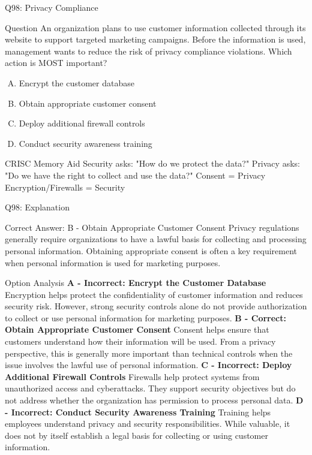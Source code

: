 \documentclass{beamer}
\begin{document}
	
	\begin{frame}{Q98: Privacy Compliance} \begin{block}{Question} An organization plans to use customer information collected through its website to support targeted marketing campaigns. Before the information is used, management wants to reduce the risk of privacy compliance violations. Which action is MOST important? \end{block} \begin{enumerate}[(A)] \item Encrypt the customer database \item Obtain appropriate customer consent \item Deploy additional firewall controls \item Conduct security awareness training \end{enumerate}  \begin{block}{CRISC Memory Aid} Security asks: "How do we protect the data?" Privacy asks: "Do we have the right to collect and use the data?" Consent = Privacy Encryption/Firewalls = Security \end{block}  \end{frame} \begin{frame}{Q98: Explanation} \footnotesize \begin{block}{Correct Answer: B - Obtain Appropriate Customer Consent} Privacy regulations generally require organizations to have a lawful basis for collecting and processing personal information. Obtaining appropriate consent is often a key requirement when personal information is used for marketing purposes. \end{block} \begin{block}{Option Analysis} \textbf{A - Incorrect: Encrypt the Customer Database} Encryption helps protect the confidentiality of customer information and reduces security risk. However, strong security controls alone do not provide authorization to collect or use personal information for marketing purposes. \vspace{0.15cm} \textbf{B - Correct: Obtain Appropriate Customer Consent} Consent helps ensure that customers understand how their information will be used. From a privacy perspective, this is generally more important than technical controls when the issue involves the lawful use of personal information. \vspace{0.15cm} \textbf{C - Incorrect: Deploy Additional Firewall Controls} Firewalls help protect systems from unauthorized access and cyberattacks. They support security objectives but do not address whether the organization has permission to process personal data. \vspace{0.15cm} \textbf{D - Incorrect: Conduct Security Awareness Training} Training helps employees understand privacy and security responsibilities. While valuable, it does not by itself establish a legal basis for collecting or using customer information. \end{block} \end{frame}
	
\end{document}
